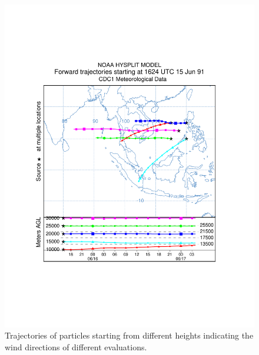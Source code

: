 \documentclass[utf8]{frontiersSCNS} %
\begin{document}
\begin{figure}[!htb]
\centering
\begin{minipage}{.75 \textwidth}
\centering
\includegraphics[width=0.99 \textwidth]{Figures/trajplot_test3_10_30K_ok}
\end{minipage}%
\caption{Trajectories of particles starting from different heights indicating the wind directions of different evaluations.}
\label{fig:hysplit-1624-utc}
\end{figure}
\end{document}
